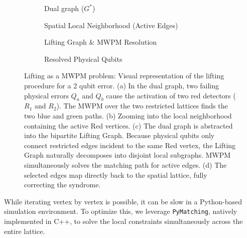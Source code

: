 \begin{figure}[!hbpt]
    \centering
    \begin{subfigure}[b]{0.45\textwidth}
        \centering
        \resizebox{\linewidth}{!}{}
        \caption{Dual graph ($G^*$)}
    \end{subfigure}
    \hfill
    \begin{subfigure}[b]{0.45\textwidth}
        \centering
        \resizebox{\linewidth}{!}{}
        \caption{Spatial Local Neighborhood (Active Edges)}
    \end{subfigure}

    \vspace{0.5cm}

    \begin{subfigure}[b]{0.45\textwidth}
        \centering
        \resizebox{\linewidth}{!}{}
        \caption{Lifting Graph \& MWPM Resolution}
    \end{subfigure}
    \hfill
    \begin{subfigure}[b]{0.45\textwidth}
        \centering
        \resizebox{\linewidth}{!}{}
        \caption{Resolved Physical Qubits}
    \end{subfigure}
    \caption[Lifting as a MWPM problem]{Lifting as a MWPM problem: Visual representation of the lifting procedure for a 2 qubit error. (a) In the dual graph, two failing physical errors $Q_a$ and $Q_b$ cause the activation of two red detectors ($R_1$ and $R_2$). The MWPM over the two restricted lattices finds the two blue and green paths. (b) Zooming into the local neighborhood containing the active Red vertices. (c) The dual graph is abstracted into the bipartite Lifting Graph. Because physical qubits only connect restricted edges incident to the same Red vertex, the Lifting Graph naturally decomposes into disjoint local subgraphs. MWPM simultaneously solves the matching path for active edges. (d) The selected edges map directly back to the spatial lattice, fully correcting the syndrome.}
    \label{fig:restriction_lifting_graph_trick}
\end{figure}

While iterating vertex by vertex is possible, it can be slow in a Python-based simulation environment. To optimize this, we leverage \texttt{PyMatching}, natively implemented in C++, to solve the local constraints simultaneously across the entire lattice.

